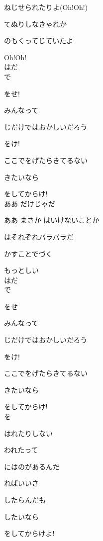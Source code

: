 ねじせられたりよ(Oh!Oh!)

てぬりしなきゃれか

のもくってじていたよ

Oh!Oh!
\\

はだ
\\

で

をせ!

みんなって

じだけではおかしいだろう

をけ!

ここでをげたらきてるない

きたいなら

をしてからけ!
\\

ああ だけじゃだ

ああ まさか はいけないことか

はそれぞれバラバラだ

かすことでづく

もっとしい
\\

はだ
\\

で

をせ

みんなって

じだけではおかしいだろう

をけ!

ここでをげたらきてるない

きたいなら

をしてからけ!
\\

を

はれたりしない

われたって

にはのがあるんだ

ればいいさ

したらんだも

したいなら

をしてからけよ!
\\
